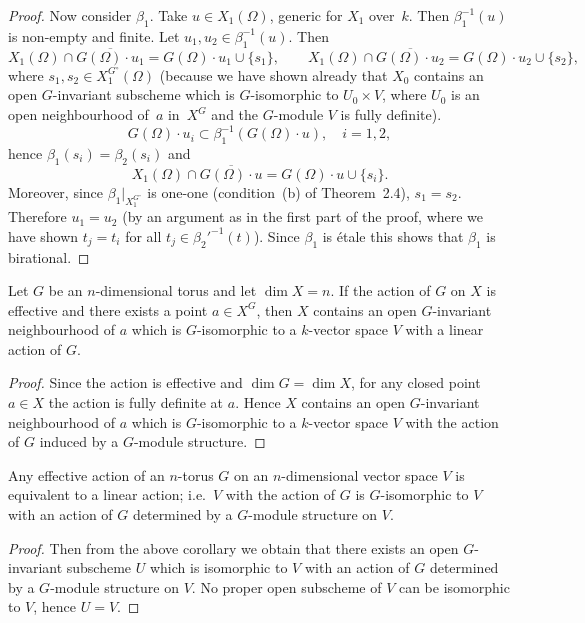 \documentclass[12pt]{article}
\begin{document}
\begin{proof}
Now consider $\beta_1$.
Take $u\in X_1(\Omega)$, generic for $X_1$ over~$k$.
Then $\beta_1^{-1}(u)$ is non-empty and finite.
Let $u_1,u_2\in\beta_1^{-1}(u)$.
Then
\[
  X_1(\Omega)\cap \overline{G(\Omega)\cdot u_1}
     = G(\Omega)\cdot u_1\cup\{s_1\},
  \qquad
  X_1(\Omega)\cap \overline{G(\Omega)\cdot u_2}
     = G(\Omega)\cdot u_2\cup\{s_2\},
\]
where $s_1,s_2\in X_1^{G^\circ}(\Omega)$
(because we have shown already that $X_0$ contains an open
$G$-invariant subscheme which is $G$-isomorphic to
$U_0\times V$, where $U_0$ is an open neighbourhood of~$a$ in~$X^G$
and the $G$-module $V$ is fully definite).
\[
  G(\Omega)\cdot u_i \subset \beta_1^{-1}(G(\Omega)\cdot u),
  \quad i=1,2,
\]
hence $\beta_1(s_i)=\beta_2(s_i)$ and
\[
  X_1(\Omega)\cap \overline{G(\Omega)\cdot u}
    = G(\Omega)\cdot u\cup\{s_i\}.
\]
Moreover, since $\beta_1|_{X_1^{G^\circ}}$ is one-one
(condition~(b) of Theorem~2.4),
$s_1=s_2$.
Therefore $u_1=u_2$ (by an argument as in the first part of the proof,
where we have shown $t_j=t_i$ for all $t_j\in\beta_2'^{-1}(t)$).
Since $\beta_1$ is \'etale this shows that $\beta_1$ is birational. \end{proof}

\begin{corollary}
Let $G$ be an $n$-dimensional torus and let $\dim X = n$.
If the action of $G$ on $X$ is effective and there exists a point $a \in X^G$, 
then $X$ contains an open $G$-invariant neighbourhood of $a$ which is 
$G$-isomorphic to a $k$-vector space $V$ with a linear action of $G$.
\end{corollary}

\begin{proof}
Since the action is effective and $\dim G = \dim X$, for any closed point 
$a \in X$ the action is fully definite at $a$. Hence $X$ contains an open 
$G$-invariant neighbourhood of $a$ which is $G$-isomorphic to a $k$-vector 
space $V$ with the action of $G$ induced by a $G$-module structure.
\end{proof}

\begin{corollary}
Any effective action of an $n$-torus $G$ on an 
$n$-dimensional vector space $V$ is equivalent to a linear action; 
i.e.\ $V$ with the action of $G$ is $G$-isomorphic to $V$ with an action 
of $G$ determined by a $G$-module structure on $V$.
\end{corollary}

\begin{proof}
Then from the above corollary we obtain that there exists an open 
$G$-invariant subscheme $U$ which is isomorphic to $V$ with an action of $G$ 
determined by a $G$-module structure on $V$. No proper open subscheme of $V$ 
can be isomorphic to $V$, hence $U = V$.
\end{proof}
\end{document}

